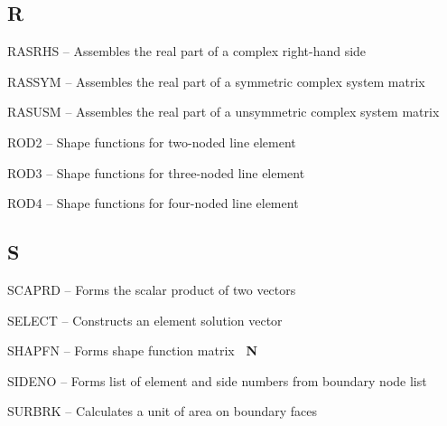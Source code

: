 \subsection*{R} %
\begin{list}{}{\leftmargin=80pt  \itemsep=0pt}
\item[RASRHS \hfill] -- Assembles the real part of a complex right-hand side
\item[RASSYM \hfill] -- Assembles the real part of a symmetric complex system matrix
\item[RASUSM \hfill] -- Assembles the real part of a unsymmetric complex system matrix
\item[ROD2 \hfill]   -- Shape functions for two-noded line element
\item[ROD3 \hfill]   -- Shape functions for three-noded line element
\item[ROD4 \hfill]   -- Shape functions for four-noded line element
\end{list}
\subsection*{S} %
\begin{list}{}{\leftmargin=80pt  \itemsep=0pt}
\item[SCAPRD \hfill] -- Forms the scalar product of two vectors
\item[SELECT \hfill] -- Constructs an element solution vector
\item[SHAPFN \hfill] -- Forms shape function matrix {\bf~N}
\item[SIDENO \hfill] -- Forms list of element and side numbers from boundary node list
\item[SURBRK \hfill] -- Calculates a unit of area on boundary faces
\end{list}
